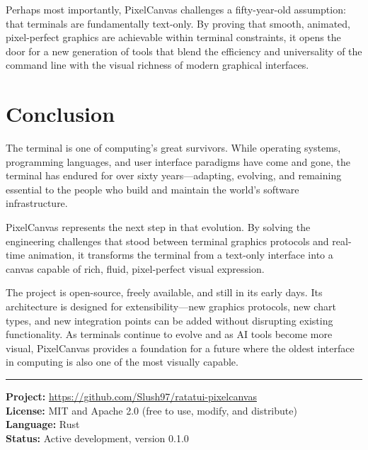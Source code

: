 \documentclass[12pt, a4paper]{article}
\begin{document}
Perhaps most importantly, PixelCanvas challenges a fifty-year-old assumption: that terminals are fundamentally text-only. By proving that smooth, animated, pixel-perfect graphics are achievable within terminal constraints, it opens the door for a new generation of tools that blend the efficiency and universality of the command line with the visual richness of modern graphical interfaces.

\section{Conclusion}

The terminal is one of computing's great survivors. While operating systems, programming languages, and user interface paradigms have come and gone, the terminal has endured for over sixty years---adapting, evolving, and remaining essential to the people who build and maintain the world's software infrastructure.

PixelCanvas represents the next step in that evolution. By solving the engineering challenges that stood between terminal graphics protocols and real-time animation, it transforms the terminal from a text-only interface into a canvas capable of rich, fluid, pixel-perfect visual expression.

The project is open-source, freely available, and still in its early days. Its architecture is designed for extensibility---new graphics protocols, new chart types, and new integration points can be added without disrupting existing functionality. As terminals continue to evolve and as AI tools become more visual, PixelCanvas provides a foundation for a future where the oldest interface in computing is also one of the most visually capable.

\vspace{2em}
\begin{center}
\rule{0.5\textwidth}{0.4pt}
\end{center}

\vspace{1em}
\noindent\small\color{warmgray}
\textbf{Project:} \url{https://github.com/Slush97/ratatui-pixelcanvas}\\
\textbf{License:} MIT and Apache 2.0 (free to use, modify, and distribute)\\
\textbf{Language:} Rust\\
\textbf{Status:} Active development, version 0.1.0
\end{document}
